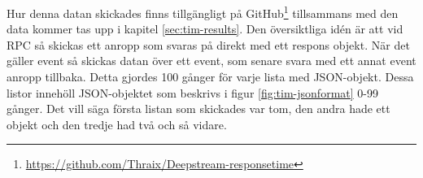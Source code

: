 Hur denna datan skickades finns tillgängligt på GitHub\footnote{\url{https://github.com/Thraix/Deepstream-responsetime} } tillsammans med den data kommer tas upp i kapitel \ref{sec:tim-results}. Den översiktliga idén är att vid RPC så skickas ett anropp som svaras på direkt med ett respons objekt. När det gäller event så skickas datan över ett event, som senare svara med ett annat event anropp tillbaka. Detta gjordes 100 gånger för varje lista med JSON-objekt. Dessa listor innehöll JSON-objektet som beskrivs i figur \ref{fig:tim-jsonformat} 0-99 gånger. Det vill säga första listan som skickades var tom, den andra hade ett objekt och den tredje had två och så vidare. 

